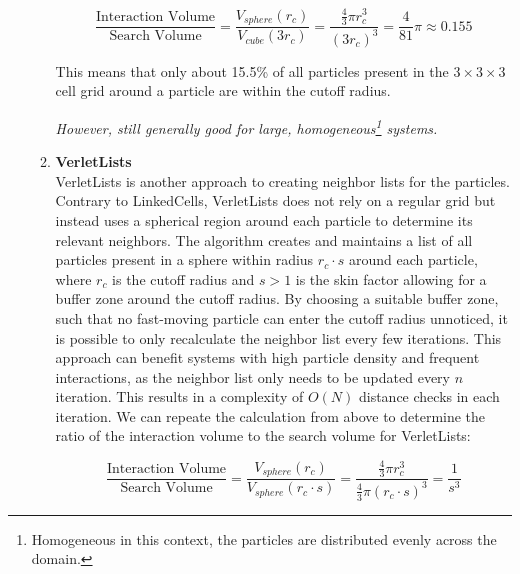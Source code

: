 \begin{enumerate}[label=\textbf{\arabic*.}]
\begin{enumerate}
                        \begin{equation}
                              \frac{\text{Interaction Volume}}{\text{Search Volume}} =
                              \frac{V_{sphere}(r_c)}{V_{cube}(3r_c)} = \frac{\frac{4}{3}\pi r_c^3}{(3r_c)^3} = \frac{4}{81}\pi \approx 0.155
                        \end{equation}

                        This means that only about 15.5\% of all particles present in the $3\times3\times3$ cell grid around a particle are within the cutoff radius.

                        \textit{However, still generally good for large, homogeneous\footnote{Homogeneous in this context, the particles are distributed evenly across the domain.} systems.}

                  \item \textbf{VerletLists} \\
                        VerletLists is another approach to creating neighbor lists for the particles. Contrary to LinkedCells, VerletLists does not rely on a regular grid but instead uses a spherical region around each particle to determine its relevant neighbors.
                        The algorithm creates and maintains a list of all particles present in a sphere within radius $r_c \cdot s$ around each particle, where $r_c$ is the cutoff radius and $s>1$ is the skin factor allowing for a buffer zone around the cutoff radius.
                        By choosing a suitable buffer zone, such that no fast-moving particle can enter the cutoff radius unnoticed, it is possible to only recalculate the neighbor list every few iterations. This approach can benefit systems with high particle density and frequent interactions, as the neighbor list only needs to be updated every $n$ iteration. This results in a complexity of $O(N)$ distance checks in each iteration.
                        We can repeate the calculation from above to determine the ratio of the interaction volume to the search volume for VerletLists:

                        \begin{equation}
                              \frac{\text{Interaction Volume}}{\text{Search Volume}} =
                              \frac{V_{sphere}(r_c)}{V_{sphere}(r_c \cdot s)} = \frac{\frac{4}{3}\pi r_c^3}{\frac{4}{3}\pi (r_c \cdot s)^3} = \frac{1}{s^3}
                        \end{equation}


\end{enumerate}
\end{enumerate}
